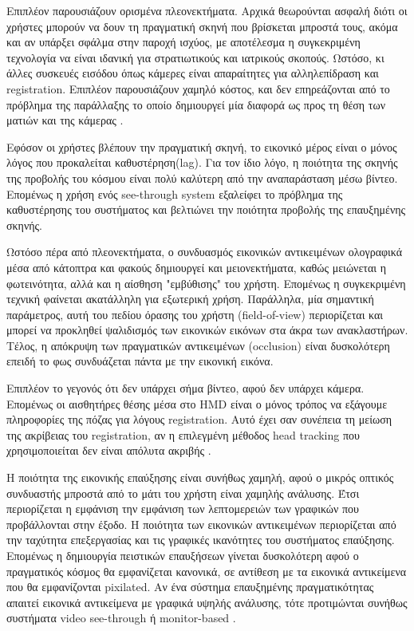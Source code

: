 Επιπλέον παρουσιάζουν ορισμένα πλεονεκτήματα. Αρχικά θεωρούνται ασφαλή διότι οι χρήστες μπορούν να δουν τη πραγματική σκηνή που βρίσκεται μπροστά τους, ακόμα και αν υπάρξει σφάλμα στην παροχή ισχύος, με αποτέλεσμα η συγκεκριμένη τεχνολογία να είναι ιδανική για στρατιωτικούς και ιατρικούς σκοπούς. Ωστόσο, κι άλλες συσκευές εισόδου όπως κάμερες είναι απαραίτητες για αλληλεπίδραση και registration. Επιπλέον παρουσιάζουν χαμηλό κόστος, και δεν επηρεάζονται από το πρόβλημα της παράλλαξης το οποίο δημιουργεί μία διαφορά ως προς τη θέση των ματιών και της κάμερας \cite{krevelen2010} .


Εφόσον οι χρήστες βλέπουν την πραγματική σκηνή, το εικονικό μέρος είναι ο μόνος λόγος που προκαλείται καθυστέρηση(lag). Για τον ίδιο λόγο, η ποιότητα της σκηνής της προβολής του κόσμου είναι πολύ καλύτερη από την αναπαράσταση μέσω βίντεο. Επομένως η χρήση ενός see-through system εξαλείφει το πρόβλημα της καθυστέρησης του συστήματος και βελτιώνει την ποιότητα προβολής της επαυξημένης σκηνής. 


Ωστόσο πέρα από πλεονεκτήματα, ο συνδυασμός εικονικών αντικειμένων ολογραφικά μέσα από κάτοπτρα και φακούς δημιουργεί και μειονεκτήματα, καθώς μειώνεται η φωτεινότητα, αλλά και η αίσθηση "εμβύθισης" του χρήστη. Επομένως η συγκεκριμένη τεχνική φαίνεται ακατάλληλη για εξωτερική χρήση. Παράλληλα, μία σημαντική παράμετρος, αυτή του πεδίου όρασης του χρήστη (field-of-view) περιορίζεται και μπορεί να προκληθεί ψαλιδισμός των εικονικών εικόνων στα άκρα των ανακλαστήρων. Τέλος, η απόκρυψη των πραγματικών αντικειμένων (occlusion) είναι δυσκολότερη επειδή το φως συνδυάζεται πάντα με την εικονική εικόνα. 

Επιπλέον το γεγονός ότι δεν υπάρχει σήμα βίντεο, αφού δεν υπάρχει κάμερα. Επομένως οι αισθητήρες θέσης μέσα στο HMD είναι ο μόνος τρόπος να εξάγουμε πληροφορίες της πόζας για λόγους registration. Αυτό έχει σαν συνέπεια τη μείωση της ακρίβειας του registration, αν η επιλεγμένη μέθοδος head tracking που χρησιμοποιείται δεν είναι απόλυτα ακριβής \cite{Malik2002} .

H ποιότητα της εικονικής επαύξησης είναι συνήθως χαμηλή, αφού ο μικρός οπτικός συνδυαστής μπροστά από το μάτι του χρήστη είναι χαμηλής ανάλυσης. Έτσι περιορίζεται η εμφάνιση την εμφάνιση των λεπτομερειών των γραφικών που προβάλλονται στην έξοδο. Η ποιότητα των εικονικών αντικειμένων περιορίζεται από την ταχύτητα επεξεργασίας και τις γραφικές ικανότητες του συστήματος επαύξησης. Επομένως η δημιουργία πειστικών επαυξήσεων γίνεται δυσκολότερη αφού ο πραγματικός κόσμος θα εμφανίζεται κανονικά, σε αντίθεση με τα εικονικά αντικείμενα που θα εμφανίζονται pixilated. Αν ένα σύστημα επαυξημένης πραγματικότητας απαιτεί εικονικά αντικείμενα με γραφικά υψηλής ανάλυσης, τότε προτιμώνται συνήθως συστήματα video see-through ή monitor-based \cite{Mcdonald2003} . 


